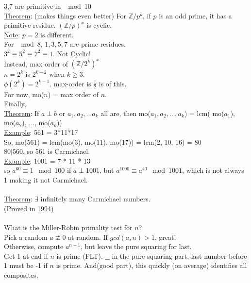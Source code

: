\documentclass[13pt]{article}
\begin{document}
	3,7 are primitive in $\mod 10$\\
	\underline{Theorem}: (makes things even better) For $\mathbb{Z}/p^k$, if
	$p$ is an odd prime, it has a primitive residue. $(\mathbb{Z}/p)^x$ is
	cyclic.\\
	\underline{Note}: $p=2$ is different. \\
	For $\mod 8$, $1, 3, 5, 7$ are prime residues.\\
	$3^2 \equiv 5^2 \equiv 7^2 \equiv 1$. Not Cyclic!\\
	Instead, max order of $(\mathbb{Z}/2^k)^x$\\
	$n = 2^k$ is $2^{k-2}$ when $k \ge 3$.\\
	$\phi(2^k) = 2^{k-1}$. max-order is $\frac{1}{2}$ is of this.\\
	For now, mo($n$) = max order of $n$. \\
	Finally, \\
	\underline{Theorem}: If $a \perp b$ or $a_1, a_2, \ldots a_k$ all are,
	then mo($a_1, a_2, \ldots, a_k$) = lcm( mo($a_1$), mo($a_2$), $\ldots$, 
	mo($a_k$))\\
	\underline{Example}: 561 = 3*11*17\\
	So, mo(561) = lcm(mo(3), mo(11), mo(17)) = lcm(2, 10, 16) = 80\\
	$80 | 560$, so 561 is Carmichael.\\
	\underline{Example}: 1001 = 7 * 11 * 13\\
	so $a^60 \equiv 1 \mod 100$ if $a \perp 1001$, but $a^1000 \equiv a^40
	\mod 1001$, which is not always 1 making it not Carmichael.\\\\
	\underline{Theorem}: $\exists$ infinitely many Carmichael numbers. \\
	(Proved in 1994)\\\\
	What is the Miller-Robin primality test for $n$?\\
	Pick a random $a \not\equiv 0$ at random. If $gcd(a,n) > 1$, great!\\
	Otherwise, compute $a^{n-1}$, but leave the pure squaring for last.\\
	Get 1 at end if $n$ is prime (FLT). $\_\_$ in the pure squaring part, last
	number before 1 must be -1 if $n$ is prime. And(good part), this quickly
	(on average) identifies all composites.
\end{document}
